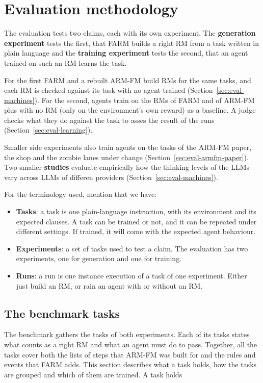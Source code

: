 \documentclass[11pt,english,listoffigures,listoftables]{tfgetsinf}
\begin{document}

\chapter{Evaluation methodology}
\label{chap:evaluation}
The evaluation tests two claims, each with its own experiment. The \textbf{generation experiment} tests the first, that FARM builds a right RM from a task written in plain language and the \textbf{training experiment} tests the second, that an agent trained on such an RM learns the task. 

For the first FARM and a rebuilt ARM-FM build RMs for the same tasks, and each RM is checked against its task with no agent trained (Section~\ref{sec:eval-machines}). For the second, agents train on the RMs of FARM and of ARM-FM plus with no RM (only on the environment's own reward) as a baseline. A judge checks what they do against the task to asses the result of the runs (Section~\ref{sec:eval-learning}). 

Smaller side experiments also train agents on the tasks of the ARM-FM paper, the shop and the zombie lanes under change (Section~\ref{sec:eval-armfm-paper}). Two smaller \textbf{studies} evaluate empirically how the thinking levels of the LLMs vary across LLMs of differen providers (Section~\ref{sec:eval-machines}).

For the terminology used, mention that we have:
\begin{itemize}
    \item \textbf{Tasks}: a task is one plain-language instruction, with its environment and its expected clauses. A task can be trained or not, and it can be repeated under different settings. If trained, it will come with the expected agent behaviour.
    \item \textbf{Experiments}: a set of tasks used to test a claim. The evaluation has two experiments, one for generation and one for training.
    \item \textbf{Runs}: a run is one instance execution of a task of one experiment. Either just build an RM, or rain an agent with or without an RM. 
\end{itemize}

\section{The benchmark tasks}
\label{sec:eval-cards}
The benchmark gathers the tasks of both experiments. Each of its tasks states what counts as a right RM and what an agent must do to pass. Together, all the tasks cover both the lists of steps that ARM-FM was built for and the rules and events that FARM adds. This section describes what a task holds, how the tasks are grouped and which of them are trained. A task holds  
\end{document}
